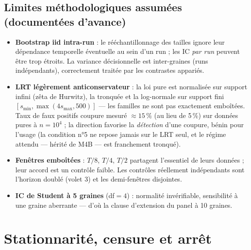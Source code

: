 \documentclass[11pt,a4paper]{article}
\begin{document}
\subsection*{Limites méthodologiques assumées (documentées d'avance)}
\begin{itemize}
\item \textbf{Bootstrap iid intra-run} : le rééchantillonnage des tailles
ignore leur dépendance temporelle éventuelle au sein d'un run ; les IC
\emph{par run} peuvent être trop étroits. La variance décisionnelle est
inter-graines (runs indépendants), correctement traitée par les
contrastes appariés.
\item \textbf{LRT légèrement anticonservateur} : la loi pure est
normalisée sur support infini (zêta de Hurwitz), la tronquée et la
log-normale sur support fini $[s_{\min},\max(4s_{\max},500)]$ — les
familles ne sont pas exactement emboîtées. Taux de faux positifs
\og coupure \fg{} mesuré $\approx15\,\%$ (au lieu de 5\,\%) sur données
pures à $n=10^4$ ; la direction favorise la \emph{détection} d'une
coupure, bénin pour l'usage (la condition n°5 ne repose jamais sur le
LRT seul, et le régime attendu — hérité de M4B — est franchement
tronqué).
\item \textbf{Fenêtres emboîtées} : $T/8$, $T/4$, $T/2$ partagent
l'essentiel de leurs données ; leur accord est un contrôle faible. Les
contrôles réellement indépendants sont l'horizon doublé (volet 3) et les
demi-fenêtres disjointes.
\item \textbf{IC de Student à 5 graines} (df$=4$) : normalité
invérifiable, sensibilité à une graine aberrante — d'où la clause
d'extension du panel à 10 graines.
\end{itemize}

\section{Stationnarité, censure et arrêt}
\label{sec:stationnarite}
\end{document}
